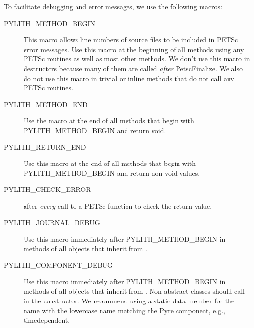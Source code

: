 To facilitate debugging and error messages, we use the following
macros:
\begin{description}
\item[PYLITH\_METHOD\_BEGIN] This macro allows line numbers of source
  files to be included in PETSc error messages. Use this macro at the
  beginning of all methods using any PETSc routines as well as most
  other methods. We don't use this macro in destructors because many
  of them are called {\em after} PetscFinalize. We also do not use
  this macro in trivial or inline methods that do not call any PETSc
  routines.
\item[PYLITH\_METHOD\_END] Use the macro at the end of all methods
  that begin with PYLITH\_METHOD\_BEGIN and return void.
\item[PYLITH\_RETURN\_END] Use this macro at the end of all methods
  that begin with PYLITH\_METHOD\_BEGIN and return non-void values.
\item[PYLITH\_CHECK\_ERROR] after {\em every} call to a PETSc function
  to check the return value.
\item[PYLITH\_JOURNAL\_DEBUG] Use this macro immediately after
  PYLITH\_METHOD\_BEGIN in methods of all objects that inherit from
  .
\item[PYLITH\_COMPONENT\_DEBUG] Use this macro immediately after
  PYLITH\_METHOD\_BEGIN in methods of all objects that inherit from
  .  Non-abstract classes should call
   in the constructor. We recommend
  using a static data member for the name with the lowercase name
  matching the Pyre component, e.g., timedependent.
\end{description}

